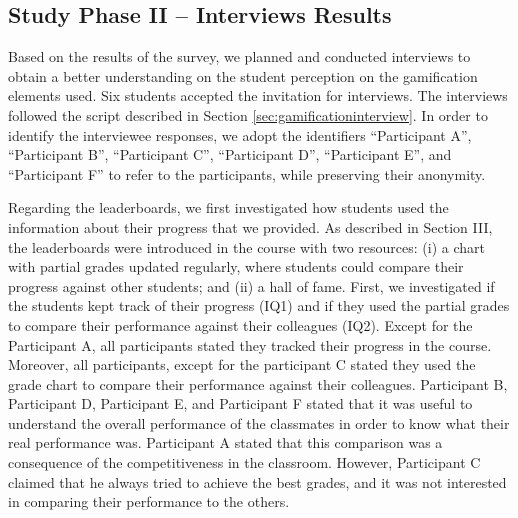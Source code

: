 \subsection{Study Phase II – Interviews Results}
\label{sec:gamificationinterviewresults}

Based on the results of the survey, we planned and conducted interviews to obtain a better understanding on the student perception on the gamification elements used. Six students accepted the invitation for interviews. The interviews followed the script described in Section \ref{sec:gamificationinterview}. In order to identify the interviewee responses, we adopt the identifiers “Participant A”, “Participant B”, “Participant C”, “Participant D”, “Participant E”, and “Participant F” to refer to the participants, while preserving their anonymity.

Regarding the leaderboards, we first investigated how students used the information about their progress that we provided. As described in Section III, the leaderboards were introduced in the course with two resources: (i) a chart with partial grades updated regularly, where students could compare their progress against other students; and (ii) a hall of fame. First, we investigated if the students kept track of their progress (IQ1) and if they used the partial grades to compare their performance against their colleagues (IQ2). Except for the Participant A, all participants stated they tracked their progress in the course. Moreover, all participants, except for the participant C stated they used the grade chart to compare their performance against their colleagues. Participant B, Participant D, Participant E, and Participant F stated that it was useful to understand the overall performance of the classmates in order to know what their real performance was. Participant A stated that this comparison was a consequence of the competitiveness in the classroom. However, Participant C claimed that he always tried to achieve the best grades, and it was not interested in comparing their performance to the others.

